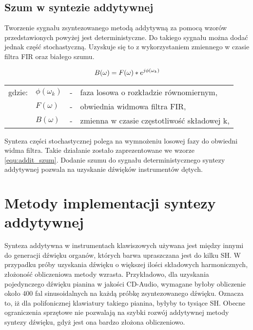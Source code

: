 \subsection{Szum w syntezie addytywnej}
Tworzenie sygnału zsyntezowanego metodą addytywną za pomocą wzorów przedstawionych powyżej jest deterministyczne. Do takiego sygnału można dodać jednak część stochastyczną. Uzyskuje się to z wykorzystaniem zmiennego w czasie filtra FIR oraz białego szumu.

\begin{equation} \label{equ:addit_szum}
B(\omega) = F(\omega)*e^{j\phi(\omega_{k})} \\  
\end{equation}
\begin{tabular}{ l l l l}
	gdzie: & $\phi(\omega_{k})$ &  - & faza losowa o rozkładzie równomiernym, \\
	& $F(\omega)$ &  - & obwiednia widmowa filtra FIR, \\
	&	$B(\omega)$ & - & zmienna w czasie częstotliwość składowej k, \\
\end{tabular}

Synteza części stochastycznej polega na wymnożeniu losowej fazy do obwiedni widma filtra. Takie działanie zostało zaprezentowane we wzorze \ref{equ:addit_szum}.
Dodanie szumu do sygnału deterministycznego syntezy addytywnej pozwala na uzyskanie dźwięków instrumentów dętych.

\section{Metody implementacji syntezy addytywnej}
Synteza addytywna w instrumentach klawiszowych używana jest między innymi do generacji dźwięku organów, których barwa upraszczana jest do kilku SH. W przypadku próby uzyskania dźwięku o większej ilości składowych harmonicznych, złożoność obliczeniowa metody wzrasta.
Przykładowo, dla uzyskania pojedynczego dźwięku pianina w jakości CD-Audio,
wymagane byłoby obliczenie około 400 fal sinusoidalnych na każdą próbkę zsyntezowanego dźwięku. Oznacza to, iż dla polifonicznej klawiatury takiego pianina, byłyby to tysiące SH. Obecne ograniczenia sprzętowe nie pozwalają na szybki rozwój addytywnej metody syntezy dźwięku, gdyż jest ona bardzo złożona obliczeniowo.

